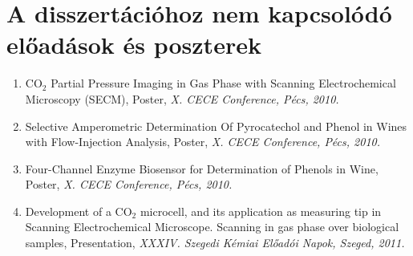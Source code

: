 \documentclass[11pt,a4paper,roman]{article}
\begin{document}
\section{A disszertációhoz nem kapcsolódó előadások és poszterek}
\begin{enumerate}
\item CO$_2$ Partial Pressure Imaging in Gas Phase with Scanning Electrochemical Microscopy (SECM), Poster, \emph{X. CECE Conference, Pécs, 2010.}

\item Selective Amperometric Determination Of Pyrocatechol and Phenol in Wines with Flow-Injection Analysis, Poster, \emph{X. CECE Conference, Pécs, 2010.}

\item Four-Channel Enzyme Biosensor for Determination of Phenols in Wine, Poster, \emph{X. CECE Conference, Pécs, 2010.}

\item Development of a CO$_2$ microcell, and its application as measuring tip in Scanning Electrochemical Microscope. Scanning in gas phase over biological samples, Presentation, \emph{XXXIV. Szegedi Kémiai Előadói Napok, Szeged, 2011.}
\end{enumerate}
\end{document}
